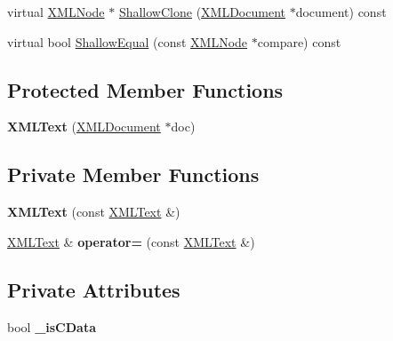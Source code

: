 \begin{DoxyCompactItemize}
\item 
virtual \hyperlink{classtinyxml2_1_1_x_m_l_node}{X\+M\+L\+Node} $\ast$ \hyperlink{classtinyxml2_1_1_x_m_l_text_abe78bbe18798e36912df53193bfdb5bd}{Shallow\+Clone} (\hyperlink{classtinyxml2_1_1_x_m_l_document}{X\+M\+L\+Document} $\ast$document) const 
\item 
virtual bool \hyperlink{classtinyxml2_1_1_x_m_l_text_af0285e689403c7061522746f34fce8df}{Shallow\+Equal} (const \hyperlink{classtinyxml2_1_1_x_m_l_node}{X\+M\+L\+Node} $\ast$compare) const 
\end{DoxyCompactItemize}
\subsection*{Protected Member Functions}
\begin{DoxyCompactItemize}
\item 
{\bfseries X\+M\+L\+Text} (\hyperlink{classtinyxml2_1_1_x_m_l_document}{X\+M\+L\+Document} $\ast$doc)\hypertarget{classtinyxml2_1_1_x_m_l_text_ad9f46d70e61e5386ead93728d8b90267}{}\label{classtinyxml2_1_1_x_m_l_text_ad9f46d70e61e5386ead93728d8b90267}

\end{DoxyCompactItemize}
\subsection*{Private Member Functions}
\begin{DoxyCompactItemize}
\item 
{\bfseries X\+M\+L\+Text} (const \hyperlink{classtinyxml2_1_1_x_m_l_text}{X\+M\+L\+Text} \&)\hypertarget{classtinyxml2_1_1_x_m_l_text_a002156e1f61ee6d48e5368b7cca25582}{}\label{classtinyxml2_1_1_x_m_l_text_a002156e1f61ee6d48e5368b7cca25582}

\item 
\hyperlink{classtinyxml2_1_1_x_m_l_text}{X\+M\+L\+Text} \& {\bfseries operator=} (const \hyperlink{classtinyxml2_1_1_x_m_l_text}{X\+M\+L\+Text} \&)\hypertarget{classtinyxml2_1_1_x_m_l_text_ad8c9f398d92fa472e213b89d8483ae8f}{}\label{classtinyxml2_1_1_x_m_l_text_ad8c9f398d92fa472e213b89d8483ae8f}

\end{DoxyCompactItemize}
\subsection*{Private Attributes}
\begin{DoxyCompactItemize}
\item 
bool {\bfseries \+\_\+is\+C\+Data}\hypertarget{classtinyxml2_1_1_x_m_l_text_aae1a8b4117e8c8bb107900a0560d5ab5}{}\label{classtinyxml2_1_1_x_m_l_text_aae1a8b4117e8c8bb107900a0560d5ab5}

\end{DoxyCompactItemize}
